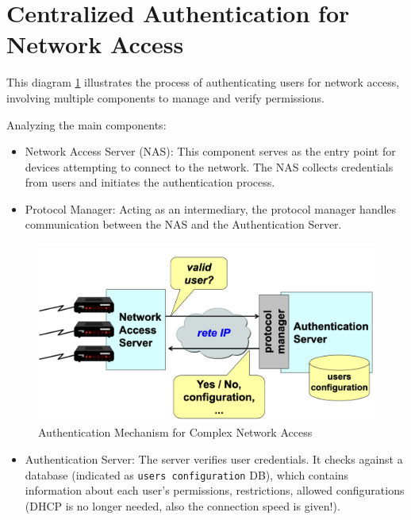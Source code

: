 \section{Centralized Authentication for Network Access}
This diagram \ref{fig:network_authentication} illustrates the process of authenticating users for network access, involving multiple components to manage and verify permissions. 

Analyzing the main components:

\begin{multicols}{2}
    \raggedcolumns

    \begin{itemize}
        \item Network Access Server (NAS): This component serves as the entry point for devices attempting to connect to the network. The NAS collects credentials from users and initiates the authentication process.
        \item Protocol Manager: Acting as an intermediary, the protocol manager handles communication between the NAS and the Authentication Server.
\end{itemize}

\columnbreak

\begin{figure}[H]
    \centering
    \includegraphics[width=\linewidth]{Images/NetSec/netsecConclusion.png}
    \caption{Authentication Mechanism for Complex Network Access}
    \label{fig:network_authentication}
\end{figure}
\end{multicols}
\begin{itemize}
    \item Authentication Server: The server verifies user credentials. It checks against a database (indicated as \texttt{users configuration} DB), which contains information about each user's permissions, restrictions,  allowed configurations (DHCP is no longer needed, also the connection speed is given!).
\end{itemize}



